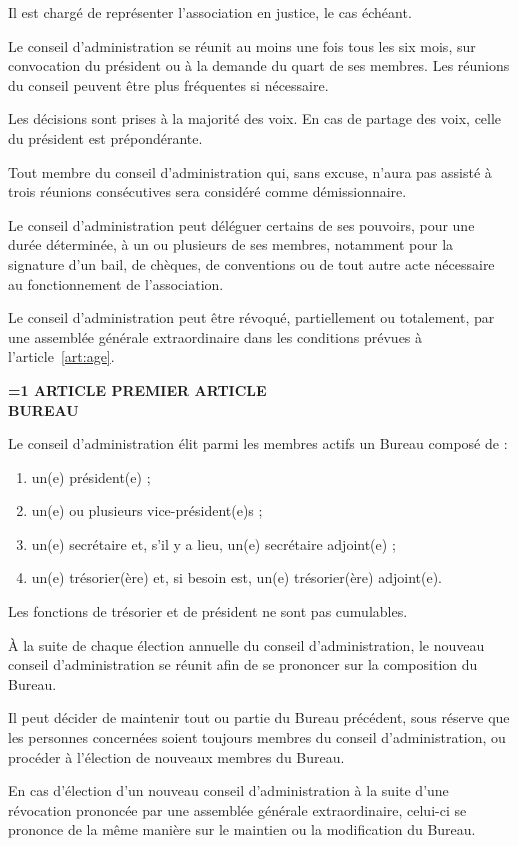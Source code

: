 \documentclass[a4paper,12pt]{article}
\newcounter{statutarticle}
\newcommand{\statutarticle}[2]{%
    \refstepcounter{statutarticle}%
    \label{#2}%
    \vspace{1.2em}%
    \begin{center}
        \textbf{%
            \ifnum\value{statutarticle}=1
                ARTICLE PREMIER%
            \else
                ARTICLE \arabic{statutarticle}%
            \fi
        }\\[0.3em]
        \textbf{#1}
    \end{center}
    \vspace{0.4em}%
}
\begin{document}
Il est chargé de représenter l'association en justice, le cas échéant.

Le conseil d'administration se réunit au moins une fois tous les six mois, sur convocation du président ou à la demande du quart de ses membres. Les réunions du conseil peuvent être plus fréquentes si nécessaire.

Les décisions sont prises à la majorité des voix. En cas de partage des voix, celle du président est prépondérante.

Tout membre du conseil d'administration qui, sans excuse, n'aura pas assisté à trois réunions consécutives sera considéré comme démissionnaire.

Le conseil d'administration peut déléguer certains de ses pouvoirs, pour une durée déterminée, à un ou plusieurs de ses membres, notamment pour la signature d'un bail, de chèques, de conventions ou de tout autre acte nécessaire au fonctionnement de l'association.

Le conseil d'administration peut être révoqué, partiellement ou totalement, par une assemblée générale extraordinaire dans les conditions prévues à l'article~\ref{art:age}.

\statutarticle{BUREAU}{art:bureau}

Le conseil d'administration élit parmi les membres actifs un Bureau composé de :

\begin{enumerate}[label=\arabic*)]
    \item un(e) président(e) ;
    \item un(e) ou plusieurs vice-président(e)s ;
    \item un(e) secrétaire et, s'il y a lieu, un(e) secrétaire adjoint(e) ;
    \item un(e) trésorier(ère) et, si besoin est, un(e) trésorier(ère) adjoint(e).
\end{enumerate}

Les fonctions de trésorier et de président ne sont pas cumulables.

À la suite de chaque élection annuelle du conseil d'administration, le nouveau conseil d'administration se réunit afin de se prononcer sur la composition du Bureau.

Il peut décider de maintenir tout ou partie du Bureau précédent, sous réserve que les personnes concernées soient toujours membres du conseil d'administration, ou procéder à l'élection de nouveaux membres du Bureau.

En cas d'élection d'un nouveau conseil d'administration à la suite d'une révocation prononcée par une assemblée générale extraordinaire, celui-ci se prononce de la même manière sur le maintien ou la modification du Bureau.
\end{document}
